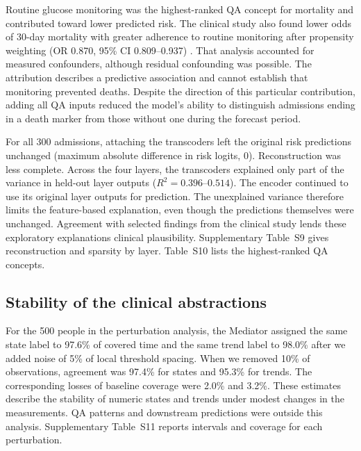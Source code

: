 Routine glucose monitoring was the highest-ranked QA concept for mortality and contributed toward lower predicted risk. The clinical study also found lower odds of 30-day mortality with greater adherence to routine monitoring after propensity weighting (OR 0.870, 95\% CI 0.809--0.937) \citep{oded2027kineret-jbi}. That analysis accounted for measured confounders, although residual confounding was possible. The attribution describes a predictive association and cannot establish that monitoring prevented deaths. Despite the direction of this particular contribution, adding all QA inputs reduced the model's ability to distinguish admissions ending in a death marker from those without one during the forecast period.

For all 300 admissions, attaching the transcoders left the original risk predictions unchanged (maximum absolute difference in risk logits, 0). Reconstruction was less complete. Across the four layers, the transcoders explained only part of the variance in held-out layer outputs ($R^2=0.396$--$0.514$). The encoder continued to use its original layer outputs for prediction. The unexplained variance therefore limits the feature-based explanation, even though the predictions themselves were unchanged. Agreement with selected findings from the clinical study lends these exploratory explanations clinical plausibility. Supplementary Table~S9 gives reconstruction and sparsity by layer. Table~S10 lists the highest-ranked QA concepts.

\subsection{Stability of the clinical abstractions}
For the 500 people in the perturbation analysis, the Mediator assigned the same state label to 97.6\% of covered time and the same trend label to 98.0\% after we added noise of 5\% of local threshold spacing. When we removed 10\% of observations, agreement was 97.4\% for states and 95.3\% for trends. The corresponding losses of baseline coverage were 2.0\% and 3.2\%. These estimates describe the stability of numeric states and trends under modest changes in the measurements. QA patterns and downstream predictions were outside this analysis. Supplementary Table~S11 reports intervals and coverage for each perturbation.
